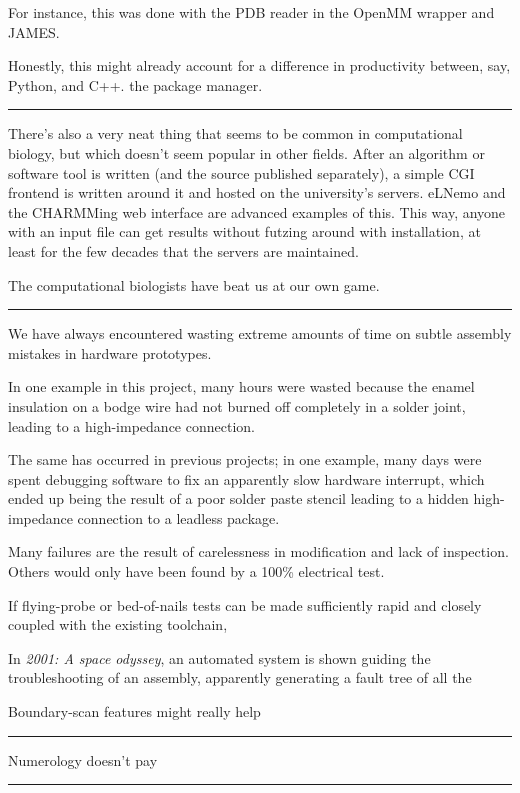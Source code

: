 \documentclass[paper.tex]{subfiles}
\begin{document}
For instance, this was done with the PDB reader in the OpenMM wrapper and JAMES.

Honestly, this might already account for a difference in productivity between, say, Python, and C++. the package manager.

\rule{\linewidth}{0.2pt}

There's also a very neat thing that seems to be common in computational biology, but which doesn't seem popular in other fields. After an algorithm or software tool is written (and the source published separately), a simple CGI frontend is written around it and hosted on the university's servers. eLNemo and the CHARMMing web interface are advanced examples of this. This way, anyone with an input file can get results without futzing around with installation, at least for the few decades that the servers are maintained.

The computational biologists have beat us at our own game.

\rule{\linewidth}{0.2pt}

We have always encountered wasting extreme amounts of time on subtle assembly mistakes in hardware prototypes. 

In one example in this project, many hours were wasted because the enamel insulation on a bodge wire had not burned off completely in a solder joint, leading to a high-impedance connection.

The same has occurred in previous projects; in one example, many days were spent debugging software to fix an apparently slow hardware interrupt, which ended up being the result of a poor solder paste stencil leading to a hidden high-impedance connection to a leadless package.

Many failures are the result of carelessness in modification and lack of inspection. Others would only have been found by a 100\% electrical test.

If flying-probe or bed-of-nails tests can be made sufficiently rapid and closely coupled with the existing toolchain, 

In {\it 2001: A space odyssey}, an automated system is shown guiding the troubleshooting of an assembly, apparently generating a fault tree of all the 

Boundary-scan features might really help 

\rule{\linewidth}{0.2pt}

Numerology doesn't pay

\rule{\linewidth}{0.2pt}
\end{document}
